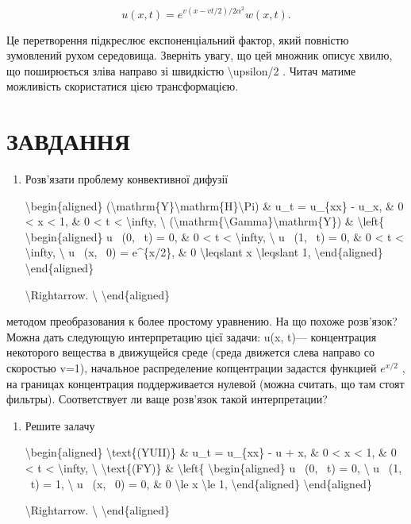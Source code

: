\documentclass[
]{article}
\begin{document}
\[
u(x, t) = e^{v(x-vt/2)/2\alpha^2}w(x, t).
\]

Це перетворення підкреслює експоненціальний фактор, який повністю
зумовлений рухом середовища. Зверніть увагу, що цей множник описує
хвилю, що поширюється зліва направо зі швидкістю
\textbackslash upsilon/2 . Читач матиме можливість скористатися цією
трансформацією.

\section{ЗАВДАННЯ}\label{ux437ux430ux432ux434ux430ux43dux43dux44f-2}

\begin{enumerate}
\def\labelenumi{\arabic{enumi}.}
\item
  Розв'язати проблему конвективної дифузії

  \textbackslash begin\{aligned\}
  (\textbackslash mathrm\{Y\}\textbackslash mathrm\{H\}\textbackslash Pi)
  \& u\_t = u\_\{xx\} - u\_x, \& 0 \textless{} x \textless{} 1, \& 0
  \textless{} t \textless{} \textbackslash infty, \textbackslash{}
  (\textbackslash mathrm\{\textbackslash Gamma\}\textbackslash mathrm\{Y\})
  \& \textbackslash left\{ \textbackslash begin\{aligned\} u ~(0, ~t) =
  0, \& 0 \textless{} t \textless{} \textbackslash infty,
  \textbackslash{} u ~(1, ~t) = 0, \& 0 \textless{} t \textless{}
  \textbackslash infty, \textbackslash{} u ~(x, ~0) = e\^{}\{x/2\}, \& 0
  \textbackslash leqslant x \textbackslash leqslant 1,
  \textbackslash end\{aligned\} \textbackslash end\{aligned\}

  \textbackslash Rightarrow. \textbackslash{}
  \textbackslash end\{aligned\}
\end{enumerate}

методом преобразования к более простому уравнению. На що похоже
розв'язок? Можна дать следующую интерпретацию цієї задачи: u(x, t)---
концентрация некоторого вещества в движущейся среде (среда движется
слева направо со скоростью v=1), начальное распределение копцентрации
задастся функцией \(e^{x/2}\) , на границах концентрация поддерживается
нулевой (можна считать, що там стоят фильтры). Соответствует ли ваще
розв'язок такой интерпретации?

\begin{enumerate}
\def\labelenumi{\arabic{enumi}.}
\setcounter{enumi}{1}
\item
  Решите залачу

  \textbackslash begin\{aligned\} \textbackslash text\{(YUII)\} \& u\_t
  = u\_\{xx\} - u + x, \& 0 \textless{} x \textless{} 1, \& 0
  \textless{} t \textless{} \textbackslash infty, \textbackslash{}
  \textbackslash text\{(FY)\} \& \textbackslash left\{
  \textbackslash begin\{aligned\} u ~(0, ~t) = 0, \textbackslash{} u
  ~(1, ~t) = 1, \textbackslash{} u ~(x, ~0) = 0, \& 0 \textbackslash le
  x \textbackslash le 1, \textbackslash end\{aligned\}
  \textbackslash end\{aligned\}

  \textbackslash Rightarrow. \textbackslash{}
  \textbackslash end\{aligned\}
\end{enumerate}
\end{document}
